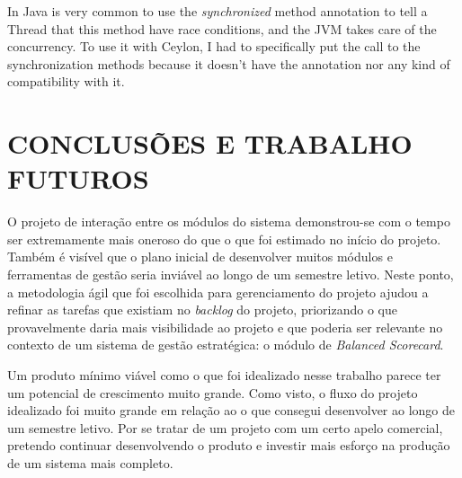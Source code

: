 \documentclass{abnt}
\begin{document}
In Java is very common to use the \textit{synchronized} method annotation to tell a
Thread that this method have race conditions, and the JVM takes care of the
concurrency. To use it with Ceylon, I had to specifically put the call to the
synchronization methods because it doesn't have the annotation nor any kind of
compatibility with it.

\chapter{CONCLUSÕES E TRABALHO FUTUROS}

O projeto de interação entre os módulos do sistema demonstrou-se com o tempo ser
extremamente mais oneroso do que o que foi estimado no início do projeto. Também
é visível que o plano inicial de desenvolver muitos módulos e ferramentas de
gestão seria inviável ao longo de um semestre letivo. Neste ponto, a metodologia
ágil que foi escolhida para gerenciamento do projeto ajudou a refinar as tarefas
que existiam no \textit{backlog} do projeto, priorizando o que provavelmente
daria mais visibilidade ao projeto e que poderia ser relevante no contexto de um
sistema de gestão estratégica: o módulo de \textit{Balanced Scorecard}.


Um produto mínimo viável como o que foi idealizado nesse trabalho parece ter um
potencial de crescimento muito grande. Como visto, o fluxo do projeto idealizado
foi muito grande em relação ao o que consegui desenvolver ao longo de um
semestre letivo. Por se tratar de um projeto com um certo apelo comercial,
pretendo continuar desenvolvendo o produto e investir mais esforço na produção
de um sistema mais completo.


\end{document}

